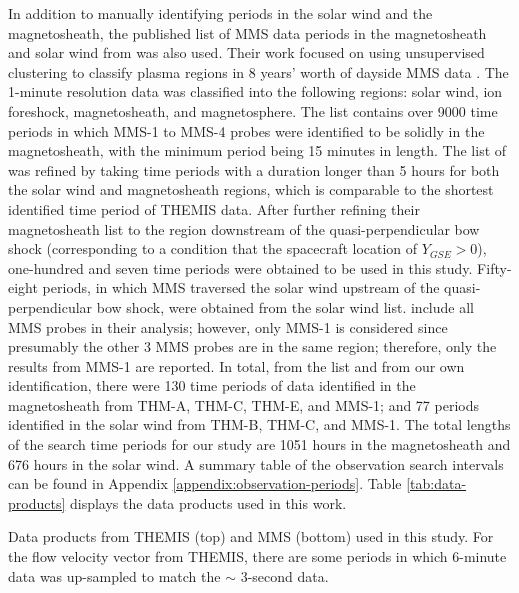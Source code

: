 In addition to manually identifying periods in the solar wind and the magnetosheath, the published list of MMS data periods in the magnetosheath and solar wind from \cite{ToyEdens:2024} was also used. Their work focused on using unsupervised clustering to classify plasma regions in 8 years' worth of dayside MMS data \citep{ToyEdens2:2024}. The 1-minute resolution data was classified into the following regions: solar wind, ion foreshock, magnetosheath, and magnetosphere. The \cite{ToyEdens:2024} list contains over 9000 time periods in which MMS-1 to MMS-4 probes were identified to be solidly in the magnetosheath, with the minimum period being 15 minutes in length. The list of \cite{ToyEdens:2024} was refined by taking time periods with a duration longer than 5 hours for both the solar wind and magnetosheath regions, which is comparable to the shortest identified time period of THEMIS data. After further refining their magnetosheath list to the region downstream of the quasi-perpendicular bow shock (corresponding to a condition that the spacecraft location of $Y_{GSE}>0$), one-hundred and seven time periods were obtained to be used in this study. Fifty-eight periods, in which MMS traversed the solar wind upstream of the quasi-perpendicular bow shock, were obtained from the \cite{ToyEdens:2024} solar wind list. \cite{ToyEdens2:2024} include all MMS probes in their analysis; however, only MMS-1 is considered since presumably the other 3 MMS probes are in the same region; therefore, only the results from MMS-1 are reported. In total, from the \cite{ToyEdens:2024} list and from our own identification, there were 130 time periods of data identified in the magnetosheath from THM-A, THM-C, THM-E, and MMS-1; and 77 periods identified in the solar wind from THM-B, THM-C, and MMS-1. The total lengths of the search time periods for our study are 1051 hours in the magnetosheath and 676 hours in the solar wind. A summary table of the observation search intervals can be found in Appendix \ref{appendix:observation-periods}. Table \ref{tab:data-products} displays the data products used in this work.

\begin{table}
    \centering
    
    \caption[Data products from THEMIS and MMS]{Data products from THEMIS (top) and MMS (bottom) used in this study. For the flow velocity vector from THEMIS, there are some periods in which 6-minute data was up-sampled to match the $\sim$ 3-second data.}
    \label{tab:data-products}
\end{table}

